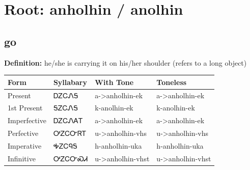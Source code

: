 \documentclass{article}%
\begin{document}
%
\normalsize%
\section*{Root: anholhin / anolhin}%
\subsection*{go}%
\textbf{Definition: }%
he/she is carrying it on his/her shoulder (refers to a long object)%
\\[0.5em]%
\begin{tabular}{|l|l|l|l|}%
\hline%
\textbf{Form}&\textbf{Syllabary}&\textbf{With Tone}&\textbf{Toneless}\\%
\hline%
Present&ᎠᏃᏟᏁᎦ&a{-}>anholhin{-}ek&a{-}>anholhin{-}ek\\%
1st Present&ᎦᏃᏟᏁᎦ&k{-}anolhin{-}ek&k{-}anolhin{-}ek\\%
Imperfective&ᎠᏃᏟᏁᎪᎢ&a{-}>anholhin{-}ek&a{-}>anholhin{-}ek\\%
Perfective&ᎤᏃᏟᏅᏒᎢ&u{-}>anholhin{-}vhs&u{-}>anholhin{-}vhs\\%
Imperative&ᎭᏃᏟᏄᎦ&h{-}anholhin{-}uka&h{-}anholhin{-}uka\\%
Infinitive&ᎤᏃᏟᏅᏍᏗ&u{-}>anholhin{-}vhst&u{-}>anholhin{-}vhst\\%
\hline%
\end{tabular}%
\\[1em]%
\end{document}
